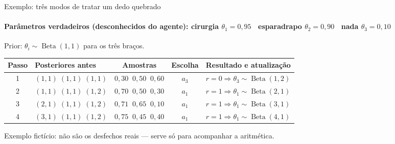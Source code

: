 \documentclass[aspectratio=169, 11pt]{beamer}
\newcommand{\Bdist}{\operatorname{Beta}}
\begin{document}
\begin{frame}{Exemplo: três modos de tratar um dedo quebrado}
  \framesubtitle{Parâmetros verdadeiros (desconhecidos do agente): cirurgia $\theta_1 = 0{,}95$ \textbullet\ esparadrapo $\theta_2 = 0{,}90$ \textbullet\ nada $\theta_3 = 0{,}10$}

  Prior: $\theta_i \sim \Bdist(1,1)$ para os três braços.

  \medskip
  \begin{center}\small
  \begin{tabular}{@{}clccl@{}}
    \toprule
    \textbf{Passo} & \textbf{Posteriores antes} & \textbf{Amostras} &
    \textbf{Escolha} & \textbf{Resultado e atualização} \\
    \midrule
    1 & $(1,1)\;(1,1)\;(1,1)$ & $0{,}30\;\;0{,}50\;\;0{,}60$ & $a_3$ & $r=0 \Rightarrow \theta_3 \sim \Bdist(1,2)$ \\
    2 & $(1,1)\;(1,1)\;(1,2)$ & $0{,}70\;\;0{,}50\;\;0{,}30$ & $a_1$ & $r=1 \Rightarrow \theta_1 \sim \Bdist(2,1)$ \\
    3 & $(2,1)\;(1,1)\;(1,2)$ & $0{,}71\;\;0{,}65\;\;0{,}10$ & $a_1$ & $r=1 \Rightarrow \theta_1 \sim \Bdist(3,1)$ \\
    4 & $(3,1)\;(1,1)\;(1,2)$ & $0{,}75\;\;0{,}45\;\;0{,}40$ & $a_1$ & $r=1 \Rightarrow \theta_1 \sim \Bdist(4,1)$ \\
    \bottomrule
  \end{tabular}
  \end{center}

  \medskip
  \begin{alertabox}
    Exemplo \alert{fictício}: não são os desfechos reais — serve só para
    acompanhar a aritmética.
  \end{alertabox}
\end{frame}
\end{document}
